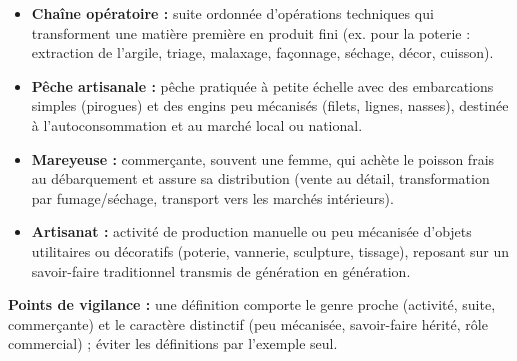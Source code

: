 \documentclass[11pt]{article}
\begin{document}
\begin{corrige}
\begin{itemize}
\item \textbf{Chaîne opératoire :} suite ordonnée d'opérations techniques qui transforment une matière première en produit fini (ex. pour la poterie : extraction de l'argile, triage, malaxage, façonnage, séchage, décor, cuisson).
\item \textbf{Pêche artisanale :} pêche pratiquée à petite échelle avec des embarcations simples (pirogues) et des engins peu mécanisés (filets, lignes, nasses), destinée à l'autoconsommation et au marché local ou national.
\item \textbf{Mareyeuse :} commerçante, souvent une femme, qui achète le poisson frais au débarquement et assure sa distribution (vente au détail, transformation par fumage/séchage, transport vers les marchés intérieurs).
\item \textbf{Artisanat :} activité de production manuelle ou peu mécanisée d'objets utilitaires ou décoratifs (poterie, vannerie, sculpture, tissage), reposant sur un savoir-faire traditionnel transmis de génération en génération.
\end{itemize}
\textbf{Points de vigilance :} une définition comporte le genre proche (activité, suite, commerçante) et le caractère distinctif (peu mécanisée, savoir-faire hérité, rôle commercial) ; éviter les définitions par l'exemple seul.
\end{corrige}
\end{document}

